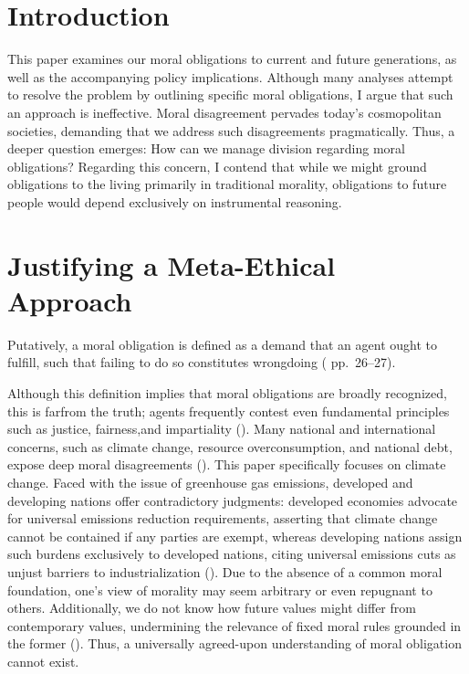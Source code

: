 
\section{Introduction}

This paper examines our moral obligations to current and future generations, as well as the accompanying policy implications. Although many analyses attempt to resolve the problem by outlining specific moral obligations, I argue that such an approach is ineffective. Moral disagreement pervades today’s cosmopolitan societies, demanding that we address such disagreements pragmatically. Thus, a deeper question emerges: How can we manage division regarding moral obligations? Regarding this concern, I contend that while we might ground obligations to the living primarily in traditional morality, obligations to future people would depend exclusively on instrumental reasoning.

\section{Justifying a Meta-Ethical Approach}

Putatively, a moral obligation is defined as a demand that an agent ought to fulfill, such that failing to do so constitutes wrongdoing (\cite{pick2004} pp.\ 26–27).

Although this definition implies that moral obligations are broadly recognized, this is farfrom the truth; agents frequently contest even fundamental principles such as justice, fairness,and impartiality (\cite{atari2020}). Many national and international concerns, such as climate change, resource overconsumption, and national debt, expose deep moral disagreements (\cite{hasan2023}). This paper specifically
focuses on climate change. Faced with the issue of greenhouse gas emissions, developed and
developing nations offer contradictory judgments: developed economies advocate for universal emissions reduction requirements, asserting that climate change cannot be contained if any parties are exempt, whereas developing nations assign such burdens exclusively to developed nations, citing universal emissions cuts as unjust barriers to industrialization (\cite{belfiori2024}). Due to the absence of a common moral foundation, one’s view of morality may seem arbitrary or even repugnant to others. Additionally, we do not know how future values might differ from contemporary values,
undermining the relevance of fixed moral rules grounded in the former (\cite{macaskill2019}). Thus, a universally agreed-upon understanding of moral obligation cannot exist.

